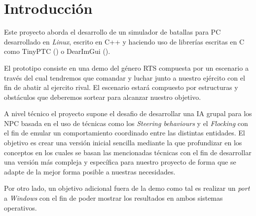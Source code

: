 \chapter{Introducción}
\label{intro}
Este proyecto aborda el desarrollo de un simulador de batallas para \ac{PC}
desarrollado en \textit{Linux}, escrito en C++ y haciendo uso de librerías escritas en
C como TinyPTC () o DearImGui ().

El prototipo consiste en una demo del género \ac{RTS}
compuesta por un escenario a través del cual tendremos que comandar y luchar junto a
nuestro ejército con el fin de abatir al ejercito rival. El escenario estará compuesto
por estructuras y obstáculos que deberemos sortear para alcanzar nuestro objetivo.

A nivel técnico el proyecto supone el desafio de desarrollar una \ac{IA} grupal
para los \ac{NPC} basada en el uso de técnicas como los \textit{Steering behaviours} 
y el \textit{Flocking} con el fin de emular un comportamiento coordinado entre las
distintas entidades. El objetivo es crear una versión inicial sencilla mediante la 
que profundizar en los conceptos en los cuales se basan las mencionadas técnicas
con el fin de desarrollar una versión más compleja y específica para nuestro proyecto
de forma que se adapte de la mejor forma posible a nuestras necesidades.

Por otro lado, un objetivo adicional fuera de la demo como tal es realizar
un \textit{port} a \textit{Windows} con el fin de poder mostrar los resultados
en ambos sistemas operativos.



